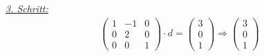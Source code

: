 \documentclass [a4paper,11pt]{article}
\begin{document}
\begin{enumerate}
\begin{enumerate}
            \underline{\textit{3. Schritt:}}\\
            \begin{align*}
                \begin{pmatrix}
                    1 & -1 & 0\\
                    0 & 2 & 0\\
                    0 & 0 & 1
                \end{pmatrix} \cdot d =
                \begin{pmatrix}
                    3\\ 0\\ 1
                \end{pmatrix}
                \Rightarrow
                \begin{pmatrix}
                    3\\ 0\\ 1
                \end{pmatrix}
            \end{align*}


\end{enumerate}
\end{enumerate}
\end{document}
